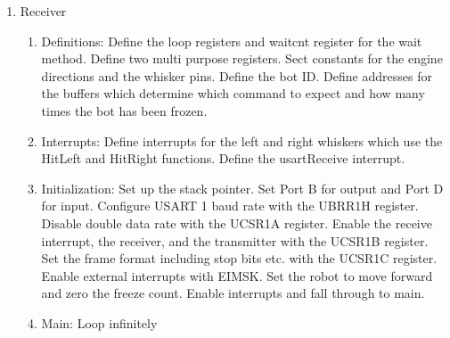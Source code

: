 \documentclass[12pt,letterpaper]{article}
\begin{document}
\begin{enumerate}
\begin{enumerate}
\end{enumerate}


\item Receiver
\begin{enumerate}
\item Definitions: Define the loop registers and waitcnt register for the wait method. Define two multi purpose registers. Sect constants for the engine directions and the whisker pins. Define the bot ID. Define addresses for the buffers which determine which command to expect and how many times the bot has been frozen.

\item Interrupts: Define interrupts for the left and right whiskers which use the HitLeft and HitRight functions. Define the usartReceive interrupt.

\item Initialization: Set up the stack pointer. Set Port B for output and Port D for input. Configure USART 1 baud rate with the UBRR1H register. Disable double data rate with the UCSR1A register. Enable the receive interrupt, the receiver, and the transmitter with the UCSR1B register. Set the frame format including stop bits etc. with the UCSR1C register. Enable external interrupts with EIMSK. Set the robot to move forward and zero the freeze count. Enable interrupts and fall through to main.

\item Main: Loop infinitely


\end{enumerate}
\end{enumerate}
\end{document}
